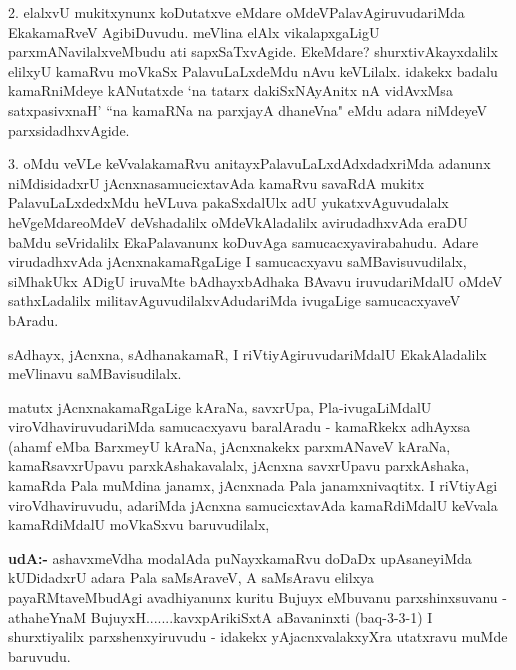 \begin{artha}
2. elalxvU mukitxynunx koDutatxve eMdare oMdeVPalavAgiruvudariMda EkakamaRveV AgibiDuvudu. meVlina elAlx vikalapxgaLigU parxmANavilalxveMbudu ati sapxSaTxvAgide. EkeMdare? shurxtivAkayxdalilx elilxyU kamaRvu moVkaSx PalavuLaLxdeMdu nAvu keVLilalx. idakekx badalu kamaRniMdeye kANutatxde `na tatarx dakiSxNAyAnitx nA vidAvxMsa satxpasivxnaH' ``na kamaRNa na parxjayA dhaneVna" eMdu adara niMdeyeV parxsidadhxvAgide.
\end{artha}

\begin{artha}
3. oMdu veVLe keVvalakamaRvu anitayxPalavuLaLxdAdxdadxriMda adanunx niMdisidadxrU jAcnxnasamucicxtavAda kamaRvu savaRdA mukitx PalavuLaLxdedxMdu heVLuva pakaSxdalUlx adU yukatxvAguvudalalx heVgeMdare\mdash  oMdeV deVshadalilx oMdeVkAladalilx avirudadhxvAda eraDU baMdu seVridalilx EkaPalavanunx koDuvAga samucacxyavirabahudu. Adare virudadhxvAda jAcnxnakamaRgaLige I samucacxyavu saMBavisuvudilalx, siMhakUkx ADigU iruvaMte bAdhayxbAdhaka BAvavu iruvudariMdalU oMdeV sathxLadalilx militavAguvudilalxvAdudariMda ivugaLige samucacxyaveV bAradu.
\end{artha}

\begin{artha}
sAdhayx, jAcnxna, sAdhanakamaR, I riVtiyAgiruvudariMdalU EkakAladalilx meVlinavu 
saMBavisudilalx.
\end{artha}


\begin{artha}
matutx jAcnxnakamaRgaLige kAraNa, savxrUpa, Pla-ivugaLiMdalU viroVdhaviruvudariMda samucacxyavu baralAradu - kamaRkekx adhAyxsa (ahamf eMba BarxmeyU kAraNa, jAcnxnakekx parxmANaveV kAraNa, kamaRsavxrUpavu parxkAshakavalalx, jAcnxna savxrUpavu parxkAshaka, kamaRda Pala muMdina janamx, jAcnxnada Pala janamxnivaqtitx. I riVtiyAgi viroVdhaviruvudu, adariMda jAcnxna samucicxtavAda kamaRdiMdalU keVvala kamaRdiMdalU moVkaSxvu baruvudilalx, 
\end{artha}


\begin{artha}
{\bf udA:-} ashavxmeVdha modalAda puNayxkamaRvu doDaDx upAsaneyiMda kUDidadxrU adara Pala saMsAraveV, A saMsAravu elilxya payaRMtaveMbudAgi avadhiyanunx kuritu Bujuyx eMbuvanu parxshinxsuvanu - athaheYnaM BujuyxH.......kavxpArikiSxtA aBavaninxti (baq-3-3-1) I shurxtiyalilx parxshenxyiruvudu - idakekx yAjacnxvalakxyXra utatxravu muMde baruvudu.
\end{artha}

